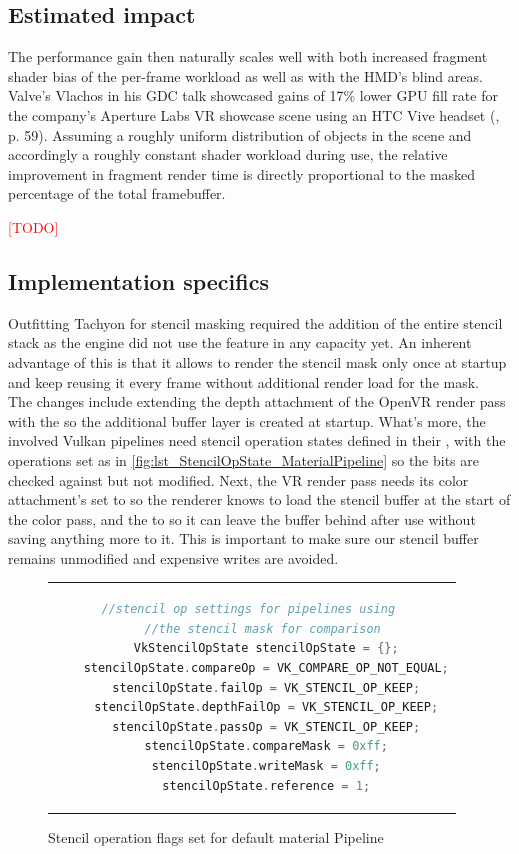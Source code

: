 \subsection{Estimated impact}
The performance gain then naturally scales well with both increased fragment shader bias of the per-frame workload as well as with the HMD's blind areas. Valve's Vlachos in his GDC talk showcased gains of 17\% lower GPU fill rate for the company's Aperture Labs VR showcase scene using an HTC Vive headset (\cite{Vlachos.2015}, p. 59). 
Assuming a roughly uniform distribution of objects in the scene and accordingly a roughly constant shader workload during use, the relative improvement in fragment render time is directly proportional to the masked percentage of the total framebuffer. 

\textcolor{red}{[TODO]}

\subsection{Implementation specifics}
Outfitting Tachyon for stencil masking required the addition of the entire stencil stack as the engine did not use the feature in any capacity yet. An inherent advantage of this is that it allows to render the stencil mask only once at startup and keep reusing it every frame without additional render load for the mask. \\
The changes include extending the depth attachment of the OpenVR render pass with the  so the additional buffer layer is created at startup. What's more, the involved Vulkan pipelines need stencil operation states defined in their , with the operations set as in \autoref{fig:lst_StencilOpState_MaterialPipeline} so the bits are checked against but not modified. Next, the VR render pass needs its color attachment's  set to  so the renderer knows to load the stencil buffer at the start of the color pass, and the  to  so it can leave the buffer behind after use without saving anything more to it. This is important to make sure our stencil buffer remains unmodified and expensive writes are avoided. 

\begin{figure}[htb]
  \centering
  \begin{tabular}{c}
  \begin{lstlisting}[language=C++]
	//stencil op settings for pipelines using 
	//the stencil mask for comparison 
	VkStencilOpState stencilOpState = {};
	stencilOpState.compareOp = VK_COMPARE_OP_NOT_EQUAL;
	stencilOpState.failOp = VK_STENCIL_OP_KEEP;
	stencilOpState.depthFailOp = VK_STENCIL_OP_KEEP;
	stencilOpState.passOp = VK_STENCIL_OP_KEEP;
	stencilOpState.compareMask = 0xff;
	stencilOpState.writeMask = 0xff;
	stencilOpState.reference = 1;
	\end{lstlisting}
  \end{tabular}
  \caption[Material pipeline stencil operation flags]{Stencil operation flags set for default material Pipeline}\label{fig:lst_StencilOpState_MaterialPipeline}
\end{figure}

